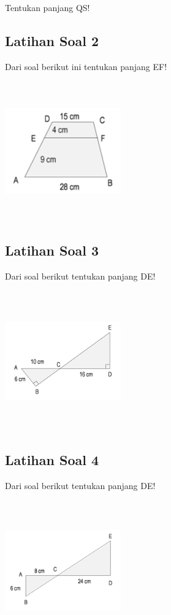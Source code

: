 \documentclass[11pt,fleqn]{book} %
\begin{document}
Tentukan panjang QS!

\subsection{Latihan Soal 2}

Dari soal berikut ini tentukan panjang EF! 

\includegraphics[width = 5cm, height= 6cm]{Pictures/a28.png}

\subsection{Latihan Soal 3}

Dari soal berikut tentukan panjang DE!

\includegraphics[width = 5cm, height= 6cm]{Pictures/a29.png}

\subsection{Latihan Soal 4}
Dari soal berikut tentukan panjang DE!

\includegraphics[width = 5cm, height= 6cm]{Pictures/a30.png}
\end{document}
